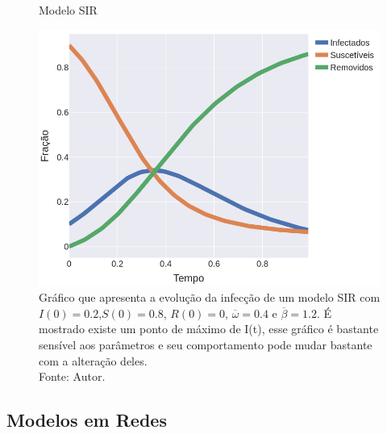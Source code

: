 \begin{figure}[H]
  \centering
  \captionsetup{font=normalsize,skip=1pt,singlelinecheck=on,labelsep=endash}
  \caption{Modelo SIR}
  \includegraphics[scale=0.5]{figuras/SIR.png}
  \captionsetup{font=small,position=below,skip=-1pt}
   \caption*{Gráfico que apresenta a evolução da infecção de um modelo SIR com $I(0) = 0.2$,$S(0) = 0.8$, 
   $R(0) = 0$, $\overline{\omega} = 0.4$ e $\overline{\beta} = 1.2$. É mostrado existe um ponto de máximo de I(t), esse gráfico é bastante sensível aos parâmetros e seu comportamento pode mudar bastante com a alteração deles.  \\Fonte: Autor.}
   \label{img:SIR}
\end{figure}

\subsection{Modelos em Redes}


